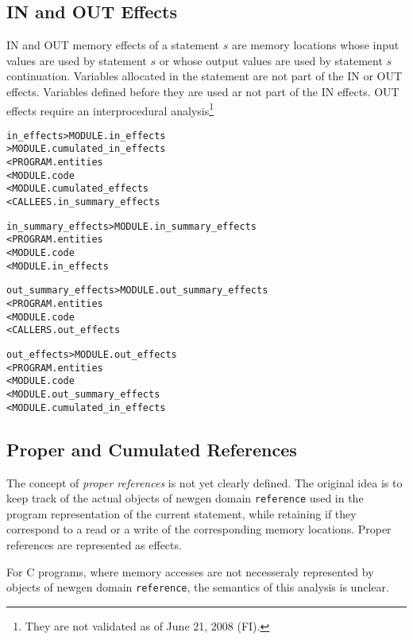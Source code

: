 \documentclass[a4paper]{report}
\newenvironment{PipsMake}{\begin{alltt}}{\end{alltt}}
\begin{document}
\subsection{IN and OUT Effects}
\label{subsubsection-in-and-out-effects}

IN and OUT memory effects of a statement $s$ are memory locations
whose input values are used by statement $s$ or whose output values
are used by statement $s$ continuation. Variables allocated in the
statement are not part of the IN or OUT effects. Variables defined
before they are used ar not part of the IN effects. OUT effects
require an interprocedural analysis\footnote{They are not validated as
of June 21, 2008 (FI).}

\begin{PipsMake}
in_effects > MODULE.in_effects
           > MODULE.cumulated_in_effects
         < PROGRAM.entities
         < MODULE.code 
         < MODULE.cumulated_effects
         < CALLEES.in_summary_effects

in_summary_effects > MODULE.in_summary_effects
        < PROGRAM.entities
        < MODULE.code
        < MODULE.in_effects

out_summary_effects > MODULE.out_summary_effects
        < PROGRAM.entities
        < MODULE.code
        < CALLERS.out_effects

out_effects > MODULE.out_effects
        < PROGRAM.entities
        < MODULE.code
        < MODULE.out_summary_effects  
        < MODULE.cumulated_in_effects  
\end{PipsMake}

\subsection{Proper and Cumulated References}
\label{subsubsection-cumulated-effects}

The concept of {\em proper references} is not yet clearly defined. The
original idea is to keep track of the actual objects of newgen domain
{\tt reference} used in the program representation of the current
statement, while retaining if they correspond to a read or a write of
the corresponding memory locations. Proper references are
represented as effects.  

For C programs, where memory accesses are not necesseraly represented
by objects of newgen domain {\tt reference}, the semantics of this
analysis is unclear.
\end{document}
